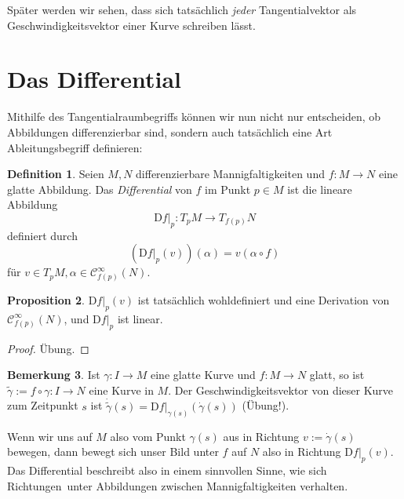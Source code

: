 \documentclass[a4paper]{scrreprt}
\numberwithin{equation}{chapter}
\newcommand{\DD}{\mathrm{D}}
\newcommand{\sC}{\mathcal{C}^{\infty}}
\theoremstyle{definition}
\newtheorem{defn}{Definition}[section]
\newtheorem{prop}[defn]{Proposition}
\newtheorem{bem}[defn]{Bemerkung}
\newcommand{\bewUeb}{\begin{proof}Übung.\end{proof}}
\begin{document}
Später werden wir sehen, dass sich tatsächlich \emph{jeder} Tangentialvektor als Geschwindigkeitsvektor einer Kurve schreiben lässt.

\section{Das Differential}

Mithilfe des Tangentialraumbegriffs können wir nun nicht nur entscheiden, ob Abbildungen differenzierbar sind, sondern auch tatsächlich eine Art Ableitungsbegriff definieren:
\begin{defn}
	Seien $M,N$ differenzierbare Mannigfaltigkeiten und $f\colon M \to N$ eine glatte Abbildung. Das \emph{Differential} von $f$ im Punkt $p\in M$ ist die lineare Abbildung
	\[\left.\DD f\right|_p \colon T_pM \to T_{f(p)}N\]
	definiert durch
	\[\left(\left.\DD f\right|_p(v)\right)(\alpha) = v (\alpha\circ f)\]
	für $v\in T_pM, \alpha \in \sC_{f(p)}(N)$.
\end{defn}
\begin{prop}
	$\left.\DD f\right|_p(v)$ ist tatsächlich wohldefiniert und eine Derivation von $\sC_{f(p)}(N)$, und $\left.\DD f\right|_p$ ist linear. \bewUeb
\end{prop}

\begin{bem}
	Ist $\gamma\colon I \to M$ eine glatte Kurve und $f\colon M \to N$ glatt, so ist $\tilde\gamma := f\circ\gamma \colon I \to N$ eine Kurve in $M$. Der Geschwindigkeitsvektor von dieser Kurve zum Zeitpunkt $s$ ist $\dot{\tilde\gamma}(s) = \left.\DD f\right|_{\gamma(s)} (\dot\gamma(s))$ (Übung!).
	
	Wenn wir uns auf $M$ also vom Punkt $\gamma(s)$ aus in Richtung $v := \dot\gamma(s)$ bewegen, dann bewegt sich unser Bild unter $f$ auf $N$ also in Richtung $\left.\DD f\right|_p(v)$. Das Differential beschreibt also in einem sinnvollen Sinne, wie sich \glqq Richtungen\grqq\ unter Abbildungen zwischen Mannigfaltigkeiten verhalten.
\end{bem}
\end{document}
